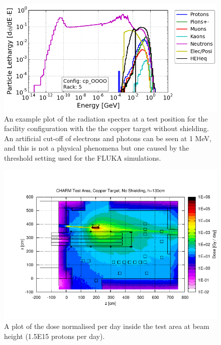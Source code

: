 \begin{figure}[!ht]
	\centering
	\includegraphics[scale=0.6]{./images/spectra_cp_OOOO_r5}
	\caption{An example plot of the radiation spectra at a test position for the facility configuration with the the copper target without shielding. An artificial cut-off of electrons and photons can be seen at 1 MeV, and this is not a physical phenomena but one caused by the threshold setting used for the FLUKA simulations.}
	\label{fig:cpOOOO_spectra}
\end{figure}

\begin{figure}[!ht]
	\centering
	\includegraphics[width=\textwidth]{./images/dose_test_area_cpOOOO}
	\caption{A plot of the dose normalised per day inside the test area at beam height (1.5E15 protons per day).}
	\label{fig:cpOOOO_dosemap}
\end{figure}

